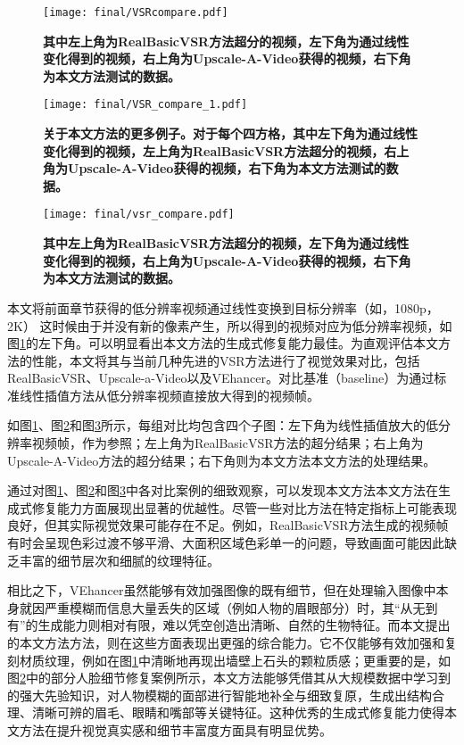 \begin{figure}[h]
    \centering
    \texttt{[image: final/VSRcompare.pdf]}
    \caption{\textbf{其中左上角为RealBasicVSR方法超分的视频，左下角为通过线性变化得到的视频，右上角为Upscale-A-Video获得的视频，右下角为本文方法测试的数据。}}
    \label{fig:vsr2}
\end{figure}

\begin{figure}[h]
    \centering
    \texttt{[image: final/VSR\_compare\_1.pdf]}
    \caption{\textbf{关于本文方法的更多例子。对于每个四方格，其中左下角为通过线性变化得到的视频，左上角为RealBasicVSR方法超分的视频，右上角为Upscale-A-Video获得的视频，右下角为本文方法测试的数据。}}
    \label{fig:vsr3}
\end{figure}

\begin{figure}[h]
    \centering
    \texttt{[image: final/vsr\_compare.pdf]}
    \caption{\textbf{其中左上角为RealBasicVSR方法超分的视频，左下角为通过线性变化得到的视频，右上角为Upscale-A-Video获得的视频，右下角为本文方法测试的数据。}}
    \label{fig:vsr1}
\end{figure}

本文将前面章节获得的低分辨率视频通过线性变换到目标分辨率（如，1080p， 2K） 这时候由于并没有新的像素产生，所以得到的视频对应为低分辨率视频，如图\ref{fig:vsr2}的左下角。可以明显看出本文方法的生成式修复能力最佳。为直观评估本文方法的性能，本文将其与当前几种先进的VSR方法进行了视觉效果对比，包括RealBasicVSR\cite{RealBasicVSR}、Upscale-a-Video\cite{zhou2024upscaleavideo}以及VEhancer\cite{he2024venhancer}。对比基准（baseline）为通过标准线性插值方法从低分辨率视频直接放大得到的视频帧。

如图\ref{fig:vsr2}、图\ref{fig:vsr3}和图\ref{fig:vsr1}所示，每组对比均包含四个子图：左下角为线性插值放大的低分辨率视频帧，作为参照；左上角为RealBasicVSR方法的超分结果；右上角为Upscale-A-Video方法的超分结果；右下角则为本文方法本文方法的处理结果。


通过对图\ref{fig:vsr2}、图\ref{fig:vsr3}和图\ref{fig:vsr1}中各对比案例的细致观察，可以发现本文方法本文方法在生成式修复能力方面展现出显著的优越性。尽管一些对比方法在特定指标上可能表现良好，但其实际视觉效果可能存在不足。例如，RealBasicVSR\cite{RealBasicVSR}方法生成的视频帧有时会呈现色彩过渡不够平滑、大面积区域色彩单一的问题，导致画面可能因此缺乏丰富的细节层次和细腻的纹理特征。

相比之下，VEhancer\cite{he2024venhancer}虽然能够有效加强图像的既有细节，但在处理输入图像中本身就因严重模糊而信息大量丢失的区域（例如人物的眉眼部分）时，其“从无到有”的生成能力则相对有限，难以凭空创造出清晰、自然的生物特征。而本文提出的本文方法方法，则在这些方面表现出更强的综合能力。它不仅能够有效加强和复刻材质纹理，例如在图\ref{fig:vsr2}中清晰地再现出墙壁上石头的颗粒质感；更重要的是，如图\ref{fig:vsr3}中的部分人脸细节修复案例所示，本文方法能够凭借其从大规模数据中学习到的强大先验知识，对人物模糊的面部进行智能地补全与细致复原，生成出结构合理、清晰可辨的眉毛、眼睛和嘴部等关键特征。这种优秀的生成式修复能力使得本文方法在提升视觉真实感和细节丰富度方面具有明显优势。

